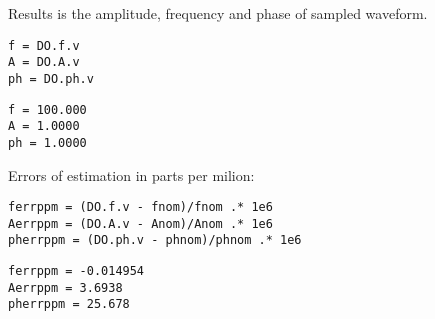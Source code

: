 Results is the amplitude, frequency and phase of sampled waveform.

\begin{lstlisting}
f = DO.f.v
A = DO.A.v
ph = DO.ph.v
\end{lstlisting}
\begin{lstlisting}[language={},xleftmargin=5pt,frame=none]
f = 100.000
A = 1.0000
ph = 1.0000

\end{lstlisting}


Errors of estimation in parts per milion:

\begin{lstlisting}
ferrppm = (DO.f.v - fnom)/fnom .* 1e6
Aerrppm = (DO.A.v - Anom)/Anom .* 1e6
pherrppm = (DO.ph.v - phnom)/phnom .* 1e6
\end{lstlisting}
\begin{lstlisting}[language={},xleftmargin=5pt,frame=none]
ferrppm = -0.014954
Aerrppm = 3.6938
pherrppm = 25.678

\end{lstlisting}


\stopcontents[localtoc]
